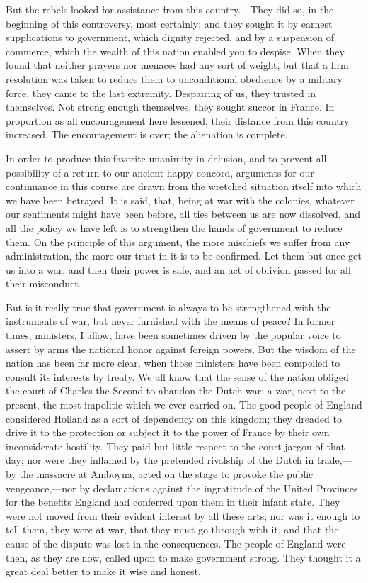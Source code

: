 But the rebels looked for assistance from this country.—They did so, in the beginning of this controversy, most certainly; and they sought it by earnest supplications to government, which dignity rejected, and by a suspension of commerce, which the wealth of this nation enabled you to despise. When they found that neither prayers nor menaces had any sort of weight, but that a firm resolution was taken to reduce them to unconditional obedience by a military force, they came to the last extremity. Despairing of us, they trusted in themselves. Not strong enough themselves, they sought succor in France. In proportion as all encouragement here lessened, their distance from this country increased. The encouragement is over; the alienation is complete.

In order to produce this favorite unanimity in delusion, and to prevent all possibility of a return to our ancient happy concord, arguments for our continuance in this course are drawn from the wretched situation itself into which we have been betrayed. It is said, that, being at war with the colonies, whatever our sentiments might have been before, all ties between us are now dissolved, and all the policy we have left is to strengthen the hands of government to reduce them. On the principle of this argument, the more mischiefs we suffer from any administration, the more our trust in it is to be confirmed. Let them but once get us into a war, and then their power is safe, and an act of oblivion passed for all their misconduct.

But is it really true that government is always to be strengthened with the instruments of war, but never furnished with the means of peace? In former times, ministers, I allow, have been sometimes driven by the popular voice to assert by arms the national honor against foreign powers. But the wisdom of the nation has been far more clear, when those ministers have been compelled to consult its interests by treaty. We all know that the sense of the nation obliged the court of Charles the Second to abandon the Dutch war: a war, next to the present, the most impolitic which we ever carried on. The good people of England considered Holland as a sort of dependency on this kingdom; they dreaded to drive it to the protection or subject it to the power of France by their own inconsiderate hostility. They paid but little respect to the court jargon of that day; nor were they inflamed by the pretended rivalship of the Dutch in trade,—by the massacre at Amboyna, acted on the stage to provoke the public vengeance,—nor by declamations against the ingratitude of the United Provinces for the benefits England had conferred upon them in their infant state. They were not moved from their evident interest by all these arts; nor was it enough to tell them, they were at war, that they must go through with it, and that the cause of the dispute was lost in the consequences. The people of England were then, as they are now, called upon to make government strong. They thought it a great deal better to make it wise and honest.

